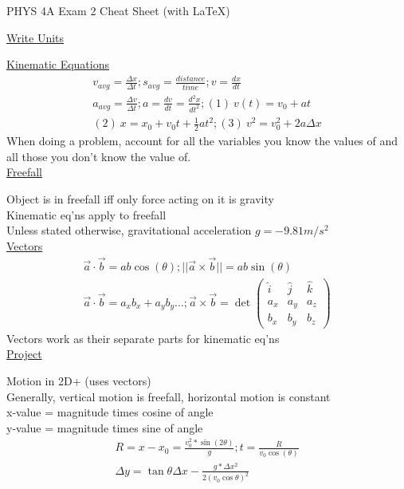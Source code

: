 \documentclass[8pt]{minimal}
\begin{document}
\setlength{\parindent}{0pt}
\setlength{\columnsep}{1cm}
\twocolumn
PHYS 4A Exam 2 Cheat Sheet (with \LaTeX)

\underline{Write Units}

\underline{Kinematic Equations}
\begin{gather*}
    v_{avg}=\frac{\Delta x}{\Delta t}; s_{avg}=\frac{distance}{time};v=\frac{dx}{dt}\\
    a_{avg}=\frac{\Delta v}{\Delta t}; a = \frac{dv}{dt} = \frac{d^2x}{dt^2}; (1)\ v(t) = v_0 + at\\
    (2)\ x = x_0 + v_0t + \frac{1}{2}at^2; (3)\ v^2 = v_0^2 + 2a\Delta x
\end{gather*}
When doing a problem, account for all the variables you know the values of and all those you don't know the value of.\\

\underline{Freefall}

Object is in freefall iff only force acting on it is gravity\\
Kinematic eq'ns apply to freefall\\
Unless stated otherwise, gravitational acceleration $g=-9.81m/s^2$\\

\underline{Vectors}
\begin{gather*}
    \vec{a} \cdot \vec{b} = ab \cos(\theta); || \vec{a}\times \vec{b} || = ab \sin(\theta)\\
    \vec{a} \cdot \vec{b} = a_x b_x+a_y b_y\dots; \vec{a}\times \vec{b} = \det \left( \begin{smallmatrix} \hat{i} & \hat{j} &\hat{k} \\ a_x & a_y & a_z \\ b_x & b_y & b_z  \end{smallmatrix} \right)
\end{gather*}
Vectors work as their separate parts for kinematic eq'ns
\\

\underline{Project}

Motion in 2D+ (uses vectors)\\
Generally, vertical motion is freefall, horizontal motion is constant \\
x-value = magnitude times cosine of angle\\
y-value = magnitude times sine of angle\\
\begin{gather*}
    R=x-x_0=\frac{v_0^2*\sin(2\theta)}{g};t=\frac{R}{v_0  \cos(\theta)}\\
    \Delta y =\tan\theta \Delta x - \frac{g*\Delta x^2}{2(v_0  \cos\theta)^2 }
\end{gather*}
\end{document}
